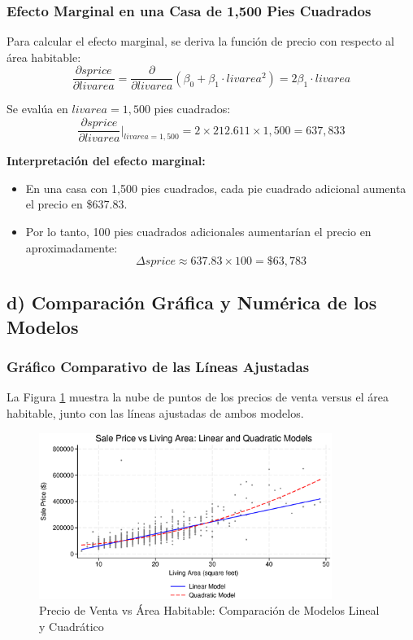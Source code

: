 \documentclass[12pt]{article}
\begin{document}
\subsubsection*{Efecto Marginal en una Casa de 1,500 Pies Cuadrados}

Para calcular el efecto marginal, se deriva la función de precio con respecto al área habitable:
\[
\frac{\partial sprice}{\partial livarea} = \frac{\partial}{\partial livarea}(\beta_0 + \beta_1 \cdot livarea^2) = 2\beta_1 \cdot livarea
\]

Se evalúa en $livarea = 1,500$ pies cuadrados:
\[
\frac{\partial sprice}{\partial livarea}\bigg|_{livarea=1,500} = 2 \times 212.611 \times 1,500 = 637,833
\]

\textbf{Interpretación del efecto marginal:}
\begin{itemize}
    \item En una casa con 1,500 pies cuadrados, cada pie cuadrado adicional aumenta el precio en \$637.83.
    \item Por lo tanto, 100 pies cuadrados adicionales aumentarían el precio en aproximadamente:
    \[
    \Delta sprice \approx 637.83 \times 100 = \boxed{\$63,783}
    \]
\end{itemize}

\subsection*{d) Comparación Gráfica y Numérica de los Modelos}

\subsubsection*{Gráfico Comparativo de las Líneas Ajustadas}

La Figura \ref{fig:fitted_comparison} muestra la nube de puntos de los precios de venta versus el área habitable, junto con las líneas ajustadas de ambos modelos.

\begin{figure}[htbp]
    \centering
    \includegraphics[width=0.85\textwidth]{Figures/0205-fitted_comparison.eps}
    \caption{Precio de Venta vs Área Habitable: Comparación de Modelos Lineal y Cuadrático}
    \label{fig:fitted_comparison}
\end{figure}
\end{document}
